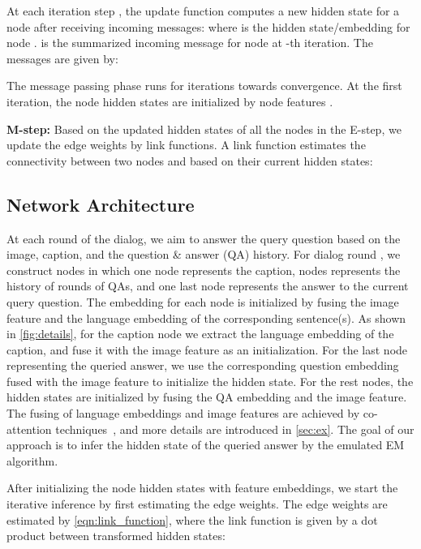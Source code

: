 \documentclass[10pt,twocolumn,letterpaper]{article}
\begin{document}
At each iteration step , the update function computes a new hidden state for a node after receiving incoming messages:
where  is the hidden state/embedding for node .  is the summarized incoming message for node  at -th iteration. The messages are given by:
\vspace*{-3pt}

The message passing phase runs for  iterations towards convergence. At the first iteration, the node hidden states  are initialized by node features .


\noindent\textbf{M-step:} Based on the updated hidden states of all the nodes in the E-step, we update the edge weights  by link functions. A link function  estimates the connectivity  between two nodes  and  based on their current hidden states:







\subsection{Network Architecture}
\label{sec:arch}
At each round of the dialog, we aim to answer the query question based on the image, caption, and the question \& answer (QA) history.
For dialog round , we construct  nodes in which one node represents the caption,  nodes represents the history of  rounds of QAs, and one last node represents the answer to the current query question. The embedding for each node is initialized by fusing the image feature and the language embedding of the corresponding sentence(s). As shown in \autoref{fig:details}, for the caption node we extract the language embedding of the caption, and fuse it with the image feature as an initialization. For the last node representing the queried answer, we use the corresponding question embedding fused with the image feature to initialize the hidden state. For the rest nodes, the hidden states are initialized by fusing the QA embedding and the image feature. The fusing of language embeddings and image features are achieved by co-attention techniques~\cite{lu2016hierarchical}, and more details are introduced in \autoref{sec:ex}. The goal of our approach is to infer the hidden state of the queried answer by the emulated EM algorithm.

After initializing the node hidden states with feature embeddings, we start the iterative inference by first estimating the edge weights. The edge weights are estimated by \autoref{eqn:link_function}, where the link function is given by a dot product between transformed hidden states:
    \vspace{-4pt}
\end{document}
